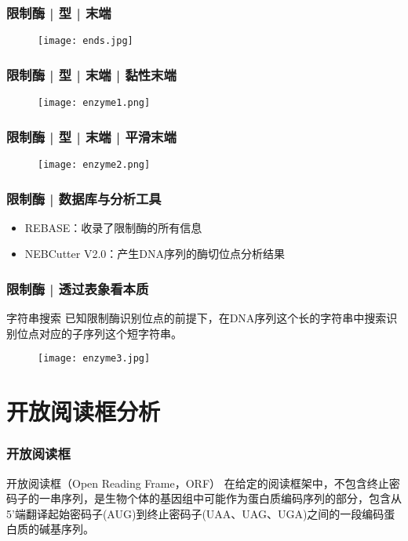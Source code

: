 \begin{frame}
  \frametitle{限制酶 | 型 | 末端}
  \begin{figure}
    \centering
    \texttt{[image: ends.jpg]}
  \end{figure}
\end{frame}

\begin{frame}
  \frametitle{限制酶 | 型 | 末端 | 黏性末端}
  \begin{figure}
    \centering
    \texttt{[image: enzyme1.png]}
  \end{figure}
\end{frame}

\begin{frame}
  \frametitle{限制酶 | 型 | 末端 | 平滑末端}
  \begin{figure}
    \centering
    \texttt{[image: enzyme2.png]}
  \end{figure}
\end{frame}

\begin{frame}
  \frametitle{限制酶 | 数据库与分析工具}
  \begin{itemize}
    \item REBASE：收录了限制酶的所有信息
    \item NEBCutter V2.0：产生DNA序列的酶切位点分析结果
  \end{itemize}
\end{frame}

\begin{frame}
  \frametitle{限制酶 | 透过表象看本质}
  \begin{block}{字符串搜索}
    已知限制酶识别位点的前提下，在DNA序列这个长的字符串中搜索识别位点对应的子序列这个短字符串。
  \end{block}
  \begin{figure}
    \centering
    \texttt{[image: enzyme3.jpg]}
  \end{figure}
\end{frame}

\section{开放阅读框分析}
\begin{frame}
  \frametitle{开放阅读框}
  \begin{block}{开放阅读框（Open Reading Frame，ORF）}
    在给定的阅读框架中，不包含终止密码子的一串序列，是生物个体的基因组中可能作为蛋白质编码序列的部分，包含从5'端翻译起始密码子(AUG)到终止密码子(UAA、UAG、UGA)之间的一段编码蛋白质的碱基序列。
  \end{block}
\end{frame}

